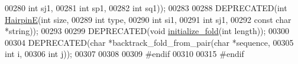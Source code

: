 \begin{DoxyCode}
00280                           \textcolor{keywordtype}{int} sj1,
00281                           \textcolor{keywordtype}{int} sp1,
00282                           \textcolor{keywordtype}{int} sq1));
00283 
00288 DEPRECATED(\textcolor{keywordtype}{int} \hyperlink{group__mfe__fold__single_gab327ce11972f5ac069d52c8dedfdb700}{HairpinE}(\textcolor{keywordtype}{int} size,
00289                         \textcolor{keywordtype}{int} type,
00290                         \textcolor{keywordtype}{int} si1,
00291                         \textcolor{keywordtype}{int} sj1,
00292                         \textcolor{keyword}{const} \textcolor{keywordtype}{char} *\textcolor{keywordtype}{string}));
00293 
00299 DEPRECATED(\textcolor{keywordtype}{void} \hyperlink{group__mfe__fold__single_gac3f0a28d9cb609d388b155445073fd20}{initialize\_fold}(\textcolor{keywordtype}{int} length));
00300 
00304 DEPRECATED(\textcolor{keywordtype}{char} *backtrack\_fold\_from\_pair(\textcolor{keywordtype}{char} *sequence,
00305                                           \textcolor{keywordtype}{int} i,
00306                                           \textcolor{keywordtype}{int} j));
00307 
00308 
00309 \textcolor{preprocessor}{#endif}
00310 
00315 \textcolor{preprocessor}{#endif}
\end{DoxyCode}
